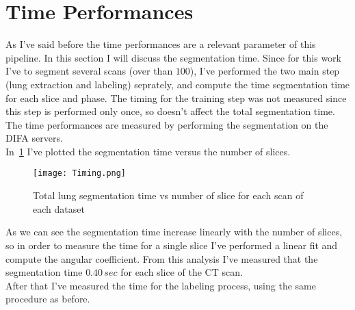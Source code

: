 \documentclass{standalone}
\begin{document}
	\section{Time Performances}
	As I've said before the time performances are a relevant parameter of this pipeline. In this section I will discuss the segmentation time.  Since for this work I've to segment several scans (over than $100$), I've performed the  two main step (lung extraction and labeling) seprately, and compute the time segmentation time for each slice and phase. The timing for the training step was not measured since this step is performed only once, so doesn't affect the total segmentation time.\\
	The time performances are measured by performing the segmentation on the DIFA servers.\\
	
	In \figurename\,\ref{fig:Timing} I've plotted the segmentation time versus the number of slices.
	 
	\begin{figure}[h!]
		\centering
			\texttt{[image: Timing.png]}
			\label{fig:Timing}\caption{Total lung segmentation time vs number of slice for each scan of each dataset}
			
	\end{figure}
	As we can see the segmentation time increase linearly with the number of slices, so in order to measure the time for a single slice I've performed a linear fit and compute the angular coefficient. From this analysis I've measured that the segmentation time $0.40\,sec$ for each slice of the CT scan.\\
	
	After that I've measured the time for the labeling process, using the same procedure as before.
\end{document}
